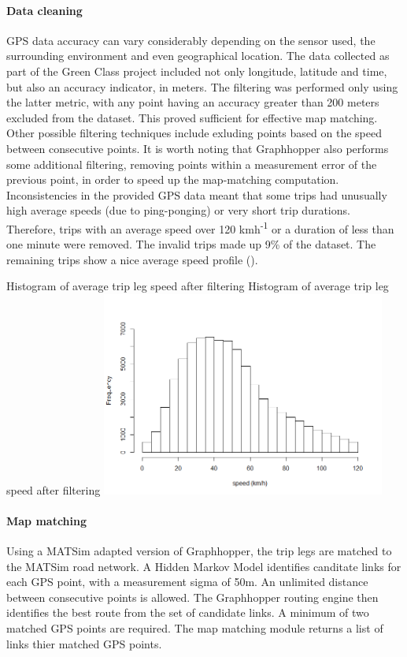 \paragraph{Data cleaning}
GPS data accuracy can vary considerably depending on the sensor used, the surrounding environment and even geographical location.
The data collected as part of the Green Class project included not only longitude, latitude and time, but also an accuracy indicator, in meters.
The filtering was performed only using the latter metric, with any point having an accuracy greater than 200 meters excluded from the dataset.
This proved sufficient for effective map matching.
Other possible filtering techniques include exluding points based on the speed between consecutive points.
It is worth noting that Graphhopper also performs some additional filtering, removing points within a measurement error of the previous point, in order to speed up the map-matching computation.
Inconsistencies in the provided GPS data meant that some trips had unusually high average speeds (due to ping-ponging) or very short trip durations.
Therefore, trips with an average speed over 120 kmh\textsuperscript{-1} or a duration of less than one minute were removed.
The invalid trips made up 9\% of the dataset.
The remaining trips show a nice average speed profile ().

\createfigure%
	{Histogram of average trip leg speed after filtering}
	{Histogram of average trip leg speed after filtering}
    {\label{fig:avg_speeds}}
    {\includegraphics[width=0.7\textwidth]{figures/avg_speed_green_class_matched}}
	{}

\paragraph{Map matching}

Using a MATSim adapted version of Graphhopper, the trip legs are matched to the MATSim road network.
A Hidden Markov Model \citep{newson2009hidden} identifies canditate links for each GPS point, with a measurement sigma of 50m.
An unlimited distance between consecutive points is allowed.
The Graphhopper routing engine then identifies the best route from the set of candidate links.
A minimum of two matched GPS points are required.
The map matching module returns a list of links thier matched GPS points.

